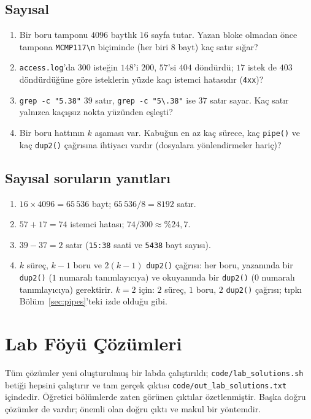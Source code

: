 \documentclass[11pt,a4paper]{article}
\newcommand{\cmd}[1]{\texttt{#1}}
\begin{document}
\subsection*{Sayısal}
\begin{enumerate}[leftmargin=1.6em,resume]
  \item Bir boru tamponu $4096$ baytlık $16$ sayfa tutar. Yazan bloke olmadan önce tampona \texttt{MCMP117\textbackslash n} biçiminde (her biri $8$ bayt) kaç satır sığar?
  \item \texttt{access.log}'da $300$ isteğin $148$'i $200$, $57$'si $404$ döndürdü; $17$ istek de $403$ döndürdüğüne göre isteklerin yüzde kaçı istemci hatasıdır (\texttt{4xx})?
  \item \cmd{grep -c "5.38"} $39$ satır, \cmd{grep -c "5\textbackslash.38"} ise $37$ satır sayar. Kaç satır yalnızca kaçışsız nokta yüzünden eşleşti?
  \item Bir boru hattının $k$ aşaması var. Kabuğun en az kaç sürece, kaç \cmd{pipe()} ve kaç \cmd{dup2()} çağrısına ihtiyacı vardır (dosyalara yönlendirmeler hariç)?
\end{enumerate}

\subsection*{Sayısal soruların yanıtları}
\begin{enumerate}[leftmargin=1.6em,start=9]
  \item $16 \times 4096 = 65\,536$ bayt; $65\,536 / 8 = 8192$ satır.
  \item $57 + 17 = 74$ istemci hatası; $74/300 \approx \%24{,}7$.
  \item $39 - 37 = 2$ satır (\texttt{15:38} saati ve \texttt{5438} bayt sayısı).
  \item $k$ süreç, $k-1$ boru ve $2(k-1)$ \cmd{dup2()} çağrısı: her boru, yazanında bir \cmd{dup2()} ($1$ numaralı tanımlayıcıya) ve okuyanında bir \cmd{dup2()} ($0$ numaralı tanımlayıcıya) gerektirir. $k = 2$ için: $2$ süreç, $1$ boru, $2$ \cmd{dup2()} çağrısı; tıpkı Bölüm~\ref{sec:pipes}'teki izde olduğu gibi.
\end{enumerate}

\section{Lab Föyü Çözümleri}
\label{sec:sol}

Tüm çözümler yeni oluşturulmuş bir labda çalıştırıldı; \cmd{code/lab\_solutions.sh} betiği hepsini çalıştırır ve tam gerçek çıktısı \cmd{code/out\_lab\_solutions.txt} içindedir. Öğretici bölümlerde zaten görünen çıktılar özetlenmiştir. Başka doğru çözümler de vardır; önemli olan doğru çıktı ve makul bir yöntemdir.
\end{document}

